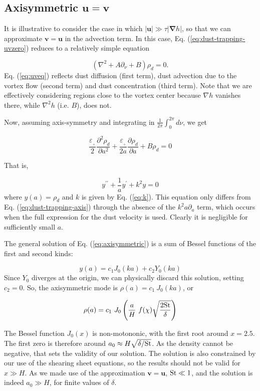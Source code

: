 \documentclass[apj]{emulateapj}
\newcommand{\pderiv}[2]{\frac{\partial #1}{\partial #2}}
\newcommand{\pderivn}[3]{\frac{\partial^{#3} #1}{\partial #2^{#3}}}
\renewcommand{\v}[1]{{\boldsymbol{#1}}} %
\newcommand{\del}{\v{\nabla}}
\newcommand{\grad}{\del}
\newcommand{\Laplace}{\nabla^2}
\newcommand{\Eq}[1]{Eq. (\ref{#1})}
\newcommand{\eq}[1]{\Eq{#1}}
\newcommand{\beq}{\begin{equation}}
\newcommand{\eeq}{\end{equation}}
\newcommand{\epsp}{\varepsilon_{_{+}}}
\begin{document}
\subsection{Axisymmetric $\v{u} = \v{v}$ }

It is illustrative to consider the case in which $|\v{u}| \gg \tau|\grad{h}|$,
so that we can approximate $\v{v}=\v{u}$ in the advection term.  In 
this case, \eq{eq:dust-trapping-uvzero} reduces to a relatively simple equation

\beq\label{eq:uveq}
\left(\Laplace{} + A\partial_\nu + B \right)\rho_d = 0. 
\eeq
\eq{eq:uveq} reflects dust diffusion (first term), dust advection due
to the vortex flow (second term) and dust concentration (third term). 
Note that we are effectively considering regions close to the vortex
center because $\nabla h$ vanishes there, while  
$\nabla^2h$ (i.e. $B$), does not.  

Now, assuming axis-symmetry and integrating in
$\frac{1}{2\pi} \int_0^{2\pi} d\nu$, we get  

\beq
\frac{\epsp}{2}\pderivn{\rho_d}{a}{2} +
\frac{\epsp}{2a}\pderiv{\rho_d}{a} + B \rho_d = 0  
\eeq

That is, 

\beq
y^{\prime\prime} + \frac{1}{a}y^\prime + k^2 y = 0 
\label{eq:axisymmetric}
\eeq where $y(a) = \rho_d$ and $k$ is given by \eq{eq:k}. This
equation only differs from \eq{eq:dust-trapping-axis} through the
absence of the $k^2a\partial_a$ term, which occurs when the full
expression for the dust velocity is used. Clearly it is negligible 
for sufficiently small $a$.  

The general solution of \eq{eq:axisymmetric} is a
sum of Bessel functions of the first and second kinds: 

\beq
y(a) = c_1 J_0 (ka) + c_2 Y_0(ka) 
\eeq
Since  $Y_0$ diverges at the origin, we can physically discard 
this solution, setting $c_2=0$. So, the axisymmetric mode is $\rho(a)
= c_1 \ J_0 (ka)$, or

\beq
\rho(a) = c_1 \ J_0 \left(\frac{a}{H} \ f(\chi) \sqrt{\frac{2{\rm St}}{\delta}}\right)
\eeq 

The Bessel function $J_0(x)$ is
non-motononic, with the first root around $x=2.5$. The first zero is therefore around
$a_0 \approx H \sqrt{\delta/{\rm St}}$.  As the density
cannot be negative, that sets the validity of our solution. 
The solution is also constrained by our use of the shearing sheet
equations, so the results should not be valid for $x \gg H$.
As we made use of the approximation $\v{v}=\v{u}$, ${\rm St} \ll 1$,
and the solution  is indeed $a_0 \gg H$, for finite values of $\delta$.
\end{document}
